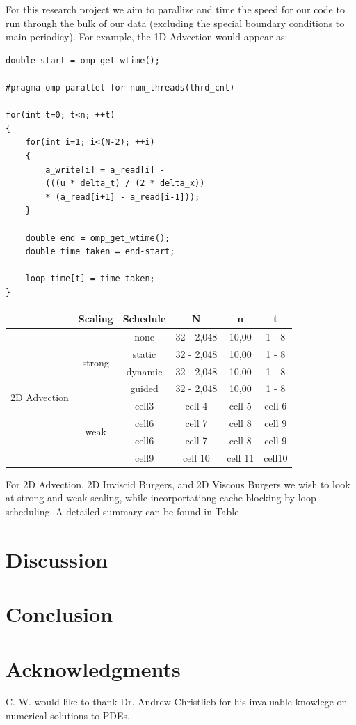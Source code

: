 \documentclass{article}
\begin{document}
For this research project we aim to parallize and time the speed for our code to run through the bulk of our data (excluding the special boundary conditions to main periodicy). For example, the 1D Advection would appear as:

\begin{lstlisting}
double start = omp_get_wtime();

#pragma omp parallel for num_threads(thrd_cnt)

for(int t=0; t<n; ++t)
{
	for(int i=1; i<(N-2); ++i)
   	{
   		a_write[i] = a_read[i] - 
   		(((u * delta_t) / (2 * delta_x)) 
   		* (a_read[i+1] - a_read[i-1]));
  	}

	double end = omp_get_wtime();
	double time_taken = end-start;
	
	loop_time[t] = time_taken;
}	
\end{lstlisting}



\begin{center}
\begin{tabular}{ |c|c|c|c|c|c| } 
\hline
 & Scaling & Schedule & N & n & t \\
\hline
\multirow{8}{4em}{2D Advection} & \multirow{4}{4em}{strong}& none & 32 - 2,048 & 10,00 & 1 - 8 \\ 
& & static & 32 - 2,048 & 10,00 & 1 - 8 \\
& & dynamic & 32 - 2,048 & 10,00 & 1 - 8 \\ 
&  & guided & 32 - 2,048 & 10,00 & 1 - 8 \\ 
\cline{2-2} %

& \multirow{4}{4em}{weak}& cell3 & cell 4 & cell 5 & cell 6 \\ 
& & cell6 & cell 7 & cell 8 & cell 9\\ 
& & cell6 & cell 7 & cell 8 & cell 9\\ 
&  & cell9 & cell 10 & cell 11& cell10 \\ 
\hline
\end{tabular}
\end{center}

For 2D Advection, 2D Inviscid Burgers, and 2D Viscous Burgers we wish to look at strong and weak scaling, while incorportationg cache blocking by loop scheduling. A detailed summary can be found in Table 




\section{Discussion}
\section{Conclusion}
\section{Acknowledgments}

C. W. would like to thank Dr. Andrew Christlieb for his invaluable knowlege on numerical solutions to PDEs.







  

\end{document}
